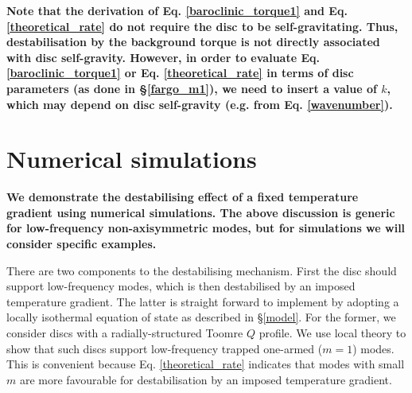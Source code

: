 {\bf Note that the derivation of Eq. \ref{baroclinic_torque1} and 
  Eq. \ref{theoretical_rate} do not 
  require the disc to be self-gravitating. Thus, destabilisation by the
  background torque is not directly associated with disc
  self-gravity. However, in order to evaluate 
  Eq. \ref{baroclinic_torque1} or Eq. \ref{theoretical_rate} in terms 
  of disc parameters (as done in \S\ref{fargo_m1}), we need to insert a 
  value of $k$, which may depend on disc    
  self-gravity (e.g. from Eq. \ref{wavenumber}).  
}   


\section{Numerical simulations}\label{methods}

{\bf
  We demonstrate the destabilising effect of a fixed temperature
  gradient using numerical simulations. The above discussion is
  generic for low-frequency non-axisymmetric modes, but for
  simulations we will consider specific examples.  
  
  There are two components to the destabilising mechanism.  First
  the disc should support low-frequency modes, which is then
  destabilised by an imposed temperature gradient. The latter is
  straight forward to implement by adopting a locally isothermal
  equation of state as described in \S\ref{model}.  For the former, we
  consider discs with a  
  radially-structured Toomre $Q$ profile. We use local theory to show that such discs support
  low-frequency trapped one-armed ($m=1$) modes. 
  This is convenient because Eq. \ref{theoretical_rate} indicates that
  modes with small $m$ are
  more favourable for destabilisation by an imposed temperature
  gradient.  
}



